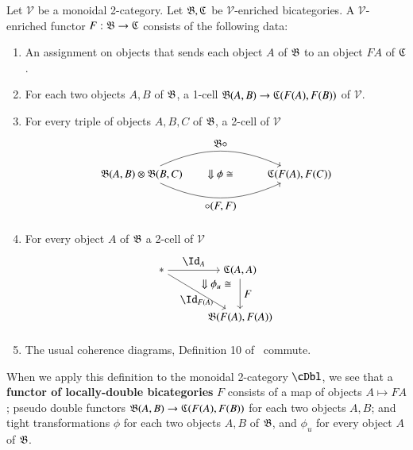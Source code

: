 {\begin{defn}\label{def:lcbcfunc}
Let $\mathcal{V}$ be a monoidal 2-category. Let ${\mathfrak{B},\mathfrak{C}}$ be $\mathcal{V}$-enriched bicategories. A $\mathcal{V}$-enriched functor $F: {\mathfrak{B}} \rightarrow {\ensuremath{\mathfrak{C}}}$ consists of the following data:
\begin{enumerate}
\item An assignment on objects that sends each object $A$ of ${\mathfrak{B}}$ to an object $F A$ of ${\mathfrak{C}}$.
\item For each two objects $A,B$ of ${\mathfrak{B}}$, a 1-cell ${\mathfrak{B}}(A,B) \rightarrow {\ensuremath{\mathfrak{C}}}(F(A),F(B))$ of $\mathcal{V}$.
\item For every triple of objects $A,B,C$ of ${\mathfrak{B}}$, a 2-cell of $\mathcal{V}$ 
\begin{align} 
\begin{tikzpicture}
\node(1) at (0,0) {${\fB}(A,B) \otimes {\fB}(B,C)$};
\node(2) at (5,0) {${\fC}(F(A),F(C))$};
\draw[->] (1) to[in=155, out=25] node[above]{$\fB \comp $} (2); 
\draw[->] (1) to[in=-155, out=-25] node[below]{$ \comp (F,F)$} (2); 
\node at (2.5,0) {$\Downarrow \phi \iso$};
\end{tikzpicture}
\end{align}
\item For every object $A$ of ${\mathfrak{B}}$ a 2-cell of $\mathcal{V}$
\begin{align}
\begin{tikzpicture}[xscale=.5, yscale=.3]
\node(1) at (0,0) {$*$};
\node(2) at (5,0) {${\fC}(A,A)$};
\node(3) at (5,-5) {${\fB}(F(A),F(A))$};
\draw[->] (1) to node[above]{$\looseid_{A}$} (2); 
\draw[->] (1) to node[below]{$\looseid_{F(A)}$} (3);
\draw[->] (2) to node[right]{$F$} (3); 
\node at (3.5,-1.5) {$\Downarrow \phi_u \iso$};
\end{tikzpicture}
\end{align}
\item The usual coherence diagrams, Definition 10 of~\cite{nick:tricatsbook} commute.
\end{enumerate}
\end{defn}

When we apply this definition to the monoidal 2-category $\cDbl$, we see that a {\bf functor of locally-double bicategories} $F$ consists of a map of objects $A \mapsto F A$; pseudo double functors ${\mathfrak{B}}(A,B) \rightarrow {\ensuremath{\mathfrak{C}}}(F(A),F(B))$ for each two objects $A,B$; and tight transformations $\phi$ for each two objects $A,B$ of ${\mathfrak{B}}$, and $\phi_u$ for every object $A$ of ${\mathfrak{B}}$. 

}
